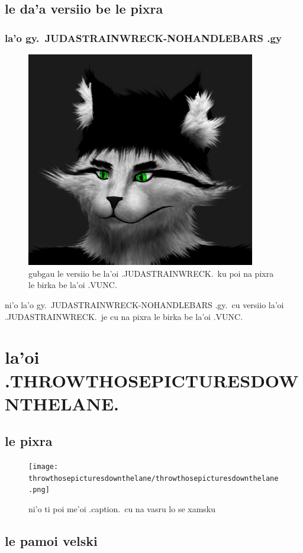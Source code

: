 \documentclass{report}
\begin{document}
\section{le da'a versiio be le pixra}

\subsection{la'o gy.\ JUDASTRAINWRECK-NOHANDLEBARS .gy}
\begin{figure}[ht]
	\centering
	\includegraphics[width=10cm]{judastrainwreck/judastrainwreck-nohandlebars.png}
	\caption[center]{gubgau le versiio be la'oi .JUDASTRAINWRECK.\ ku poi na pixra le birka be la'oi .VUNC.}
\end{figure}
ni'o la'o gy.\ JUDASTRAINWRECK-NOHANDLEBARS .gy.\ cu versiio la'oi .JUDASTRAINWRECK.\ je cu na pixra le birka be la'oi .VUNC.

\chapter{la'oi .THROWTHOSEPICTURESDOWNTHELANE.}
\section{le pixra}
\begin{figure}[ht]
	\centering
	\texttt{[image: throwthosepicturesdownthelane/throwthosepicturesdownthelane.png]}
	\caption[center]{ni'o ti poi me'oi .caption.\ cu na vasru lo se xamsku}
\end{figure}
\section{le pamoi velski}
\end{document}
